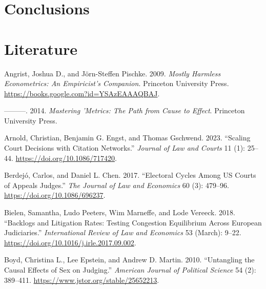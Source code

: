\documentclass[
  11pt,
]{article}
\newlength{\cslhangindent}
\newenvironment{CSLReferences}[2] %
 {%
  \setlength{\parindent}{0pt}
  \ifodd #1 \everypar{\setlength{\hangindent}{\cslhangindent}}\ignorespaces\fi
  \ifnum #2 > 0
  \setlength{\parskip}{#2\baselineskip}
  \fi
 }%
 {}
\begin{document}
\hypertarget{conclusions}{%
\section{Conclusions}\label{conclusions}}

\vspace{30pt}

\hypertarget{literature}{%
\section*{Literature}\label{literature}}

\hypertarget{refs}{}
\begin{CSLReferences}{1}{0}
\leavevmode{}%
Angrist, Joshua D., and Jörn-Steffen Pischke. 2009. \emph{Mostly
{Harmless Econometrics}: {An Empiricist}'s {Companion}}. {Princeton
University Press}. \url{https://books.google.com?id=YSAzEAAAQBAJ}.

\leavevmode{}%
---------. 2014. \emph{Mastering '{Metrics}: {The Path} from {Cause} to
{Effect}}. {Princeton University Press}.

\leavevmode{}%
Arnold, Christian, Benjamin G. Engst, and Thomas Gschwend. 2023.
{``Scaling {Court Decisions} with {Citation Networks}.''} \emph{Journal
of Law and Courts} 11 (1): 25--44. \url{https://doi.org/10.1086/717420}.

\leavevmode{}%
Berdejó, Carlos, and Daniel L. Chen. 2017. {``Electoral {Cycles} Among
{US Courts} of {Appeals Judges}.''} \emph{The Journal of Law and
Economics} 60 (3): 479--96. \url{https://doi.org/10.1086/696237}.

\leavevmode{}%
Bielen, Samantha, Ludo Peeters, Wim Marneffe, and Lode Vereeck. 2018.
{``Backlogs and Litigation Rates: {Testing} Congestion Equilibrium
Across {European} Judiciaries.''} \emph{International Review of Law and
Economics} 53 (March): 9--22.
\url{https://doi.org/10.1016/j.irle.2017.09.002}.

\leavevmode{}%
Boyd, Christina L., Lee Epstein, and Andrew D. Martin. 2010.
{``Untangling the {Causal Effects} of {Sex} on {Judging}.''}
\emph{American Journal of Political Science} 54 (2): 389--411.
\url{https://www.jstor.org/stable/25652213}.


\end{CSLReferences}
\end{document}
